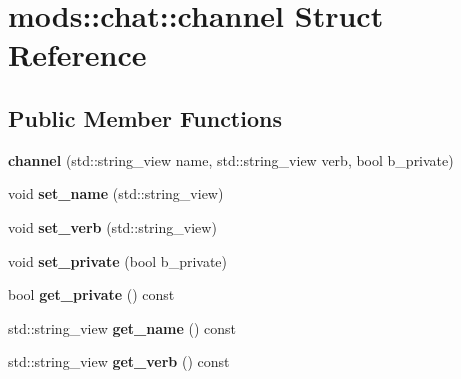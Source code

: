 \hypertarget{structmods_1_1chat_1_1channel}{}\section{mods\+:\+:chat\+:\+:channel Struct Reference}
\label{structmods_1_1chat_1_1channel}
\subsection*{Public Member Functions}
\begin{DoxyCompactItemize}
\item 
\mbox{\label{structmods_1_1chat_1_1channel_a03605194e9d5863d66d50521693f10ea}} 
{\bfseries channel} (std\+::string\+\_\+view name, std\+::string\+\_\+view verb, bool b\+\_\+private)
\item 
\mbox{\label{structmods_1_1chat_1_1channel_a0b9df9aeb856bb8bafee2a52028dd8ac}} 
void {\bfseries set\+\_\+name} (std\+::string\+\_\+view)
\item 
\mbox{\label{structmods_1_1chat_1_1channel_af281efe0ee6d1422e9aeb40aeef72579}} 
void {\bfseries set\+\_\+verb} (std\+::string\+\_\+view)
\item 
\mbox{\label{structmods_1_1chat_1_1channel_a7a5bd9cdadad82a0bb341cf083419f79}} 
void {\bfseries set\+\_\+private} (bool b\+\_\+private)
\item 
\mbox{\label{structmods_1_1chat_1_1channel_acb43f3d466b286ce5bac996f7f10e1e3}} 
bool {\bfseries get\+\_\+private} () const
\item 
\mbox{\label{structmods_1_1chat_1_1channel_a6c8711d6bd96af39d99f550209f082e8}} 
std\+::string\+\_\+view {\bfseries get\+\_\+name} () const
\item 
\mbox{\label{structmods_1_1chat_1_1channel_a288d9d2c5ab3e3e54260fcf22b8252bd}} 
std\+::string\+\_\+view {\bfseries get\+\_\+verb} () const
\item 
\mbox{\label{structmods_1_1chat_1_1channel_ae25dccd4d87f74386a11fad2fc31a2ee}} 

\end{DoxyCompactItemize}
